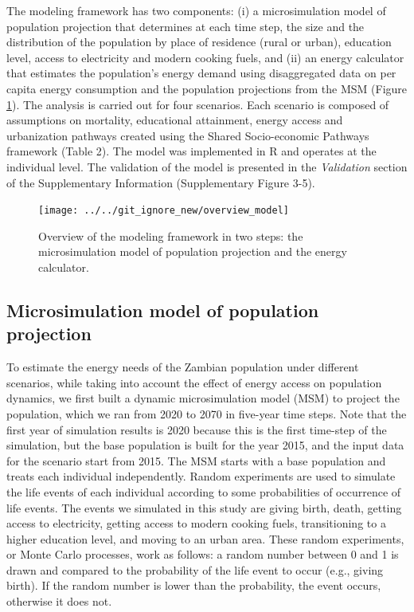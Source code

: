 \documentclass[
]{article}
\begin{document}
The modeling framework has two components: (i) a microsimulation model of population projection that determines at each time step, the size and the distribution of the population by place of residence (rural or urban), education level, access to electricity and modern cooking fuels, and (ii) an energy calculator that estimates the population's energy demand using disaggregated data on per capita energy consumption and the population projections from the MSM (Figure \ref{fig:model-overview}). The analysis is carried out for four scenarios. Each scenario is composed of assumptions on mortality, educational attainment, energy access and urbanization pathways created using the Shared Socio-economic Pathways framework (Table 2). The model was implemented in R and operates at the individual level. The validation of the model is presented in the \emph{Validation} section of the Supplementary Information (Supplementary Figure 3-5).

\begin{figure}

{\centering \texttt{[image: ../../git\_ignore\_new/overview\_model]} 

}

\caption{Overview of the modeling framework in two steps: the microsimulation model of population projection and the energy calculator.}\label{fig:model-overview}
\end{figure}

\hypertarget{microsimulation-model-of-population-projection}{%
\subsection{Microsimulation model of population projection}\label{microsimulation-model-of-population-projection}}

To estimate the energy needs of the Zambian population under different scenarios, while taking into account the effect of energy access on population dynamics, we first built a dynamic microsimulation model (MSM) to project the population, which we ran from 2020 to 2070 in five-year time steps. Note that the first year of simulation results is 2020 because this is the first time-step of the simulation, but the base population is built for the year 2015, and the input data for the scenario start from 2015. The MSM starts with a base population and treats each individual independently. Random experiments are used to simulate the life events of each individual according to some probabilities of occurrence of life events. The events we simulated in this study are giving birth, death, getting access to electricity, getting access to modern cooking fuels, transitioning to a higher education level, and moving to an urban area. These random experiments, or Monte Carlo processes, work as follows: a random number between 0 and 1 is drawn and compared to the probability of the life event to occur (e.g., giving birth). If the random number is lower than the probability, the event occurs, otherwise it does not.
\end{document}
